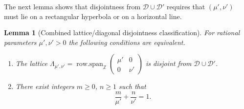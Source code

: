 \documentclass[11pt, letterpaper, reqno]{amsart}
\newtheorem{lem}[thm]{Lemma}
\theoremstyle{definition}
\theoremstyle{remark}
\numberwithin{equation}{section}
\newcommand{\ZZ}{\ensuremath{\mathbb{Z}}}
\newcommand{\uu}{{\mu'}}
\newcommand{\vv}{{\nu'}}
\newcommand{\cD}{\mathcal{D}}
\newcommand{\cDprime}{{\mathcal{D}'}}
\DeclareMathOperator{\rowspan}{row.span}
\begin{document}
The next lemma 
shows that disjointness from $\cD\cup \cDprime$  requires
that $(\uu, \vv)$ must lie  on a rectangular hyperbola or on a horizontal line. 

\begin{lem}[Combined lattice/diagonal   disjointness classification]
\label{lem:diagonal-vert-boundary}
For rational parameters $\uu, \vv> 0$ the following conditions are equivalent.
\begin{enumerate}
\item[\textnormal{(M1')}] 
The lattice 
$\Lambda_{\uu,\vv} = \rowspan_\ZZ
\begin{pmatrix}
\uu & 0 \\ 
0 & \vv \end{pmatrix}$
 is disjoint from 
$\cD\cup \cDprime$.

\item[\textnormal{(M2')}] 
There exist integers $m\geq 0$, $n\geq 1$ such that
  \begin{equation*}
  \frac{m}{\uu} + \frac{n}{\vv} = 1.
  \end{equation*}
\end{enumerate}
\end{lem}
\end{document}
